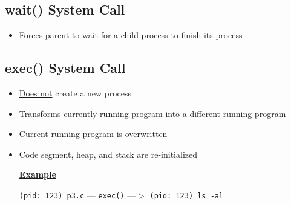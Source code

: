 \documentclass[12pt]{article}
\begin{document}
\subsection{wait() System Call}
\begin{itemize}
    \item Forces parent to wait for a child process to finish its process
\end{itemize}

\subsection{exec() System Call}
\begin{itemize}
    \item \underline{Does not} create a new process
    \item Transforms currently running program into a different running program
    \item Current running program is overwritten
    \item Code segment, heap, and stack are re-initialized

    \bigskip

    \underline{\textbf{Example}}

    \bigskip

    \texttt{(pid: 123) p3.c} --- \texttt{exec()} ---$>$ \texttt{(pid: 123) ls -al}

\end{itemize}
\end{document}
